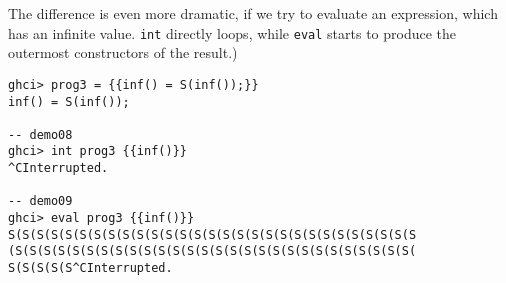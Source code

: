 The difference is even more dramatic, if we try to evaluate an expression, which has an infinite value.
\texttt{int} directly loops, while \texttt{eval} starts to produce the outermost constructors
of the result.)
\begin{lstlisting}[style=demo]
ghci> prog3 = {{inf() = S(inf());}}
inf() = S(inf());

-- demo08
ghci> int prog3 {{inf()}}
^CInterrupted.

-- demo09
ghci> eval prog3 {{inf()}}
S(S(S(S(S(S(S(S(S(S(S(S(S(S(S(S(S(S(S(S(S(S(S(S(S(S(S(S(S
(S(S(S(S(S(S(S(S(S(S(S(S(S(S(S(S(S(S(S(S(S(S(S(S(S(S(S(S(
S(S(S(S(S^CInterrupted.
\end{lstlisting}
